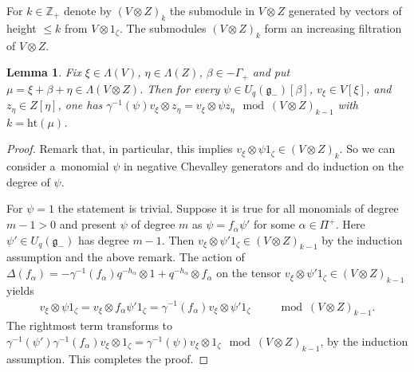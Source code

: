 \documentclass[11pt]{article}
\numberwithin{equation}{section}
\newtheorem{Lemma}[Theorem]{Lemma}
\begin{document}
For $k\in \mathbb{Z}_+$ denote by $(V\otimes Z)_k$ the submodule in $V\otimes Z$ generated by vectors of height $\leqslant k$ from $V\otimes 1_\zeta$. The submodules $(V\otimes Z)_k$ form an increasing filtration of $V\otimes Z$.
\begin{Lemma}\label{diagonal}Fix $\xi\in \Lambda(V)$, $\eta\in \Lambda(Z)$, $\beta\in -\Gamma_+$ and put $\mu=\xi+\beta+\eta \in\Lambda(V\otimes Z)$. Then for every $\psi \in U_q(\mathfrak{g}_-)[\beta]$, $v_\xi\in V[\xi]$, and $z_\eta\in Z[\eta]$, one has $\gamma^{-1}(\psi) v_\xi\otimes z_\eta = v_\xi\otimes \psi z_\eta \mod (V\otimes Z)_{k-1}$ with $k=\mathrm{ht}(\mu)$.
\end{Lemma}
\begin{proof}Remark that, in particular, this implies $v_\xi\otimes \psi 1_\zeta \in (V\otimes Z)_{k}$. So we can consider a~monomial $\psi$ in negative Chevalley generators and do induction on the degree of $\psi$.

For $\psi=1$ the statement is trivial. Suppose it is true for all monomials of degree $m-1>0$ and present $\psi$ of degree $m$ as $\psi= f_{\alpha} \psi'$ for some $\alpha \in \Pi^+$. Here $\psi'\in U_q(\mathfrak{g}_-)$ has
degree $m-1$. Then $v_\xi\otimes \psi' 1_\zeta \in (V\otimes Z)_{k-1}$ by the induction assumption and the above remark. The action of $\Delta(f_\alpha)=- \gamma^{-1}(f_{\alpha} )q^{-h_\alpha}\otimes 1+q^{-h_\alpha}\otimes f_\alpha$ on the tensor $v_\xi\otimes \psi' 1_\zeta\in (V\otimes Z)_{k-1}$ yields
\begin{gather*}
 v_\xi\otimes\psi 1_\zeta= v_\xi\otimes f_\alpha \psi' 1_\zeta=\gamma^{-1}(f_{\alpha}) v_\xi\otimes \psi' 1_\zeta \qquad \mod (V\otimes Z)_{k-1}.
\end{gather*}
The rightmost term transforms to $\gamma^{-1}(\psi')\gamma^{-1}(f_{\alpha}) v_\xi\otimes 1_\zeta=\gamma^{-1}(\psi) v_\xi\otimes 1_\zeta \mod(V\otimes Z)_{k-1}$, by the induction assumption. This completes the proof.
\end{proof}
\end{document}
